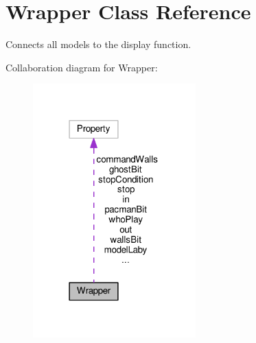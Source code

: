 \hypertarget{class_wrapper}{}\section{Wrapper Class Reference}
\label{class_wrapper}


Connects all models to the display function.  




Collaboration diagram for Wrapper\+:
\nopagebreak
\begin{figure}[H]
\begin{center}
\leavevmode
\includegraphics[width=178pt]{class_wrapper__coll__graph}
\end{center}
\end{figure}
